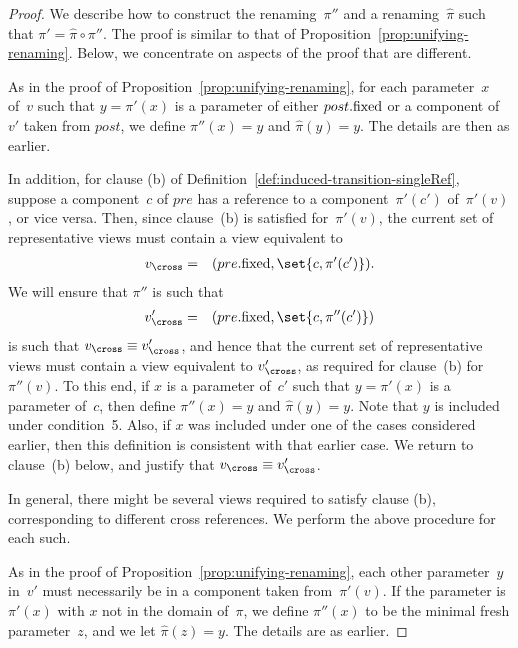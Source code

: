 \begin{proof}
We describe how to construct the renaming~$\pi''$ and a renaming~$\hat\pi$
such that $\pi' = \hat\pi \circ \pi''$.  The proof is similar to that of
Proposition~\ref{prop:unifying-renaming}.  Below, we concentrate on aspects of
the proof that are different.

As in the proof of Proposition~\ref{prop:unifying-renaming}, for each
parameter~$x$ of~$v$ such that $y = \pi'(x)$ is a parameter of either
$post.\mathrm{fixed}$ or a component of $v'$ taken from $post$, we define $\pi''(x) =
y$ and $\hat\pi(y) = y$.  The details are then as earlier.

In addition, for clause (b) of
Definition~\ref{def:induced-transition-singleRef}, suppose a component~$c$ of
$pre$ has a reference to a component~$\pi'(c')$ of~$\pi'(v)$, or vice versa.
Then, since clause~(b) is satisfied for~$\pi'(v)$, the current set of
representative views must contain a view equivalent to 
\begin{eqnarray*}
v_\cross & = & (pre.\fixed, \set{c,\pi'(c')}).
\end{eqnarray*}
%
We will ensure that $\pi''$ is such that
%
\begin{eqnarray*}
v_\cross' & = & (pre.\fixed, \set{c,\pi''(c')})
\end{eqnarray*}
%
is such that $v_\cross \equiv v_\cross'$, and hence that the current set of
representative views must contain a view equivalent to $v_\cross'$, as
required for clause~(b) for~$\pi''(v)$.  To this end, if $x$ is a parameter
of~$c'$ such that $y = \pi'(x)$ is a parameter of~$c$, then define $\pi''(x) =
y$ and $\hat\pi(y) = y$.  Note that $y$ is included under condition~5.  Also,
if $x$ was included under one of the cases considered earlier, then this
definition is consistent with that earlier case.  We return to clause~(b)
below, and justify that $v_\cross \equiv v_\cross'$.

In general, there might be several views required to satisfy clause (b),
corresponding to different cross references.  We perform the above procedure
for each such. 

As in the proof of Proposition~\ref{prop:unifying-renaming}, each other
parameter~$y$ in~$v'$ must necessarily be in a component taken from~$\pi'(v)$.
If the parameter is $\pi'(x)$ with $x$ not in the domain of~$\pi$,
we define $\pi''(x)$ to be the minimal fresh parameter~$z$, and we let
$\hat\pi(z) = y$.  The details are as earlier.


\end{proof}
